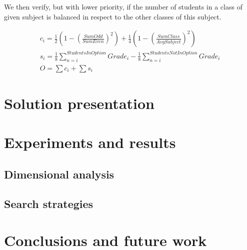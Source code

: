 \documentclass[runningheads]{llncs}
\begin{document}
We then verify, but with lower priority, if the number of students in a class of given subject is balanced in respect to the other classes of this subject.

\begin{gather}
    c_i = \frac{1}{2}\left(1-\left(\frac{SumOdd}{SumEven}\right)^2\right) + \frac{1}{4}\left(1-\left(\frac{SumClass}{AvgSubject}\right)^2\right) \\
    s_i = \frac{1}{8}\sum_{n=i} ^ {StudentsInOption}{Grade_{i}} - \frac{1}{8}\sum_{n=i} ^ {StudentsNotInOption}{Grade_{i}} \\
    O = \sum{c_i} + \sum{s_i}
\end{gather}

\section{Solution presentation}

\section{Experiments and results}

\subsection{Dimensional analysis}

\subsection{Search strategies}

\section{Conclusions and future work}

%
%



\end{document}
